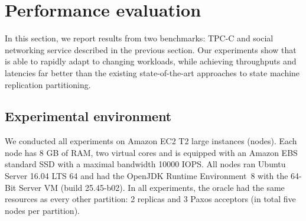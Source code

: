 \section{Performance evaluation}
\label{sec:experiments}

In this section, we report results from two benchmarks: TPC-C and
\appname{} social networking service described in the previous section.
Our experiments show that \dynastar{} is able to rapidly adapt to changing 
workloads, while achieving throughputs and latencies far better than the existing
state-of-the-art approaches to state machine replication partitioning.


\subsection{Experimental environment}
\label{sec:evaluation:setup}

We conducted all experiments on Amazon EC2 T2 large instances (nodes). Each node has 8 GB of RAM, 
two virtual cores and is equipped with an Amazon EBS standard SSD with a maximal bandwidth 10000 IOPS.
All nodes ran Ubuntu Server 16.04 LTS 64 and had the OpenJDK Runtime Environment~8 with the
\mbox{64-Bit} Server VM (build 25.45-b02). In all experiments, the oracle 
had the same resources as every other partition: 2 replicas and 3 Paxos acceptors 
(in total five nodes per partition).




